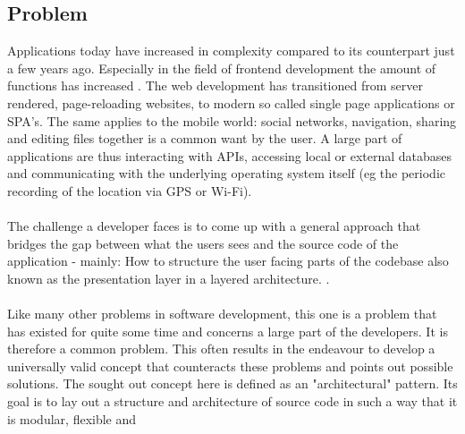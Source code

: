 \subsection{Problem}
\label{subsec:problem}


Applications today have increased in complexity compared to its counterpart just a few years ago. Especially in the field of frontend development the amount of 
functions has increased
\cite{increasingNatureOfFrontendKevinBall2018}. 
The web development has transitioned from server rendered, 
page-reloading websites, to modern so called single page applications or SPA's.
The same applies to the mobile world: social networks, navigation, sharing and editing files together is a common want by the user.
A large part of applications are thus interacting with APIs, accessing local or external databases
and communicating with the underlying operating system itself (eg the periodic recording of the location via GPS or Wi-Fi).
\\
\\
The challenge a developer faces is to come up with a general approach that bridges the gap between what the users sees and the source code of 
the application - mainly: How to structure the user facing parts of the codebase also known as the presentation layer
\cite{patternsOfEnterpriseApplicationArchitectureMartinFowlerPresentationLayer,softwareArchitecturePatternMarkRichards2015PresentationLayer} 
in a layered architecture.
\cite{threeTierArchitectureDonaldWolfe2013}.
\\
\\
Like many other problems in software development, this one is a problem that has existed for quite some time and concerns a large part of the developers.
It is therefore a common problem. This often results in the endeavour to develop a universally valid concept that counteracts these problems and points out 
possible solutions. The sought out concept here is defined as an "architectural" pattern.
\cite{softwareArchitecturePatternMarkRichards2015, patternOrientedSoftwareArchitectureFrankBuschmann2007, designPatternElementsOfErichGamma2000}
Its goal is to lay out a structure and architecture of source code in such a way that it is modular, flexible and

